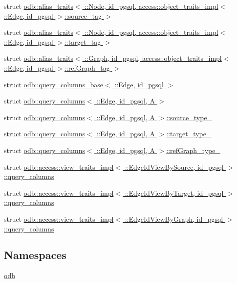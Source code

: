 \begin{DoxyCompactItemize}
\item 
struct \hyperlink{structodb_1_1alias__traits_3_01_1_1_node_00_01id__pgsql_00_01access_1_1object__traits__impl_3_01db58b174ecb0ad95fbb7b688e9500987}{odb\+::alias\+\_\+traits$<$ \+::\+Node, id\+\_\+pgsql, access\+::object\+\_\+traits\+\_\+impl$<$ \+::\+Edge, id\+\_\+pgsql $>$\+::source\+\_\+tag $>$}
\item 
struct \hyperlink{structodb_1_1alias__traits_3_01_1_1_node_00_01id__pgsql_00_01access_1_1object__traits__impl_3_01c77bcdc9abf6acd8227118fe90727154}{odb\+::alias\+\_\+traits$<$ \+::\+Node, id\+\_\+pgsql, access\+::object\+\_\+traits\+\_\+impl$<$ \+::\+Edge, id\+\_\+pgsql $>$\+::target\+\_\+tag $>$}
\item 
struct \hyperlink{structodb_1_1alias__traits_3_01_1_1_graph_00_01id__pgsql_00_01access_1_1object__traits__impl_3_0b3284584314bfa017251cf7444a96ae4}{odb\+::alias\+\_\+traits$<$ \+::\+Graph, id\+\_\+pgsql, access\+::object\+\_\+traits\+\_\+impl$<$ \+::\+Edge, id\+\_\+pgsql $>$\+::ref\+Graph\+\_\+tag $>$}
\item 
struct \hyperlink{structodb_1_1query__columns__base_3_01_1_1_edge_00_01id__pgsql_01_4}{odb\+::query\+\_\+columns\+\_\+base$<$ \+::\+Edge, id\+\_\+pgsql $>$}
\item 
struct \hyperlink{structodb_1_1query__columns_3_01_1_1_edge_00_01id__pgsql_00_01_a_01_4}{odb\+::query\+\_\+columns$<$ \+::\+Edge, id\+\_\+pgsql, A $>$}
\item 
struct \hyperlink{structodb_1_1query__columns_3_01_1_1_edge_00_01id__pgsql_00_01_a_01_4_1_1source__type__}{odb\+::query\+\_\+columns$<$ \+::\+Edge, id\+\_\+pgsql, A $>$\+::source\+\_\+type\+\_\+}
\item 
struct \hyperlink{structodb_1_1query__columns_3_01_1_1_edge_00_01id__pgsql_00_01_a_01_4_1_1target__type__}{odb\+::query\+\_\+columns$<$ \+::\+Edge, id\+\_\+pgsql, A $>$\+::target\+\_\+type\+\_\+}
\item 
struct \hyperlink{structodb_1_1query__columns_3_01_1_1_edge_00_01id__pgsql_00_01_a_01_4_1_1ref_graph__type__}{odb\+::query\+\_\+columns$<$ \+::\+Edge, id\+\_\+pgsql, A $>$\+::ref\+Graph\+\_\+type\+\_\+}
\item 
struct \hyperlink{structodb_1_1access_1_1view__traits__impl_3_01_1_1_edge_id_view_by_source_00_01id__pgsql_01_4_1_1query__columns}{odb\+::access\+::view\+\_\+traits\+\_\+impl$<$ \+::\+Edge\+Id\+View\+By\+Source, id\+\_\+pgsql $>$\+::query\+\_\+columns}
\item 
struct \hyperlink{structodb_1_1access_1_1view__traits__impl_3_01_1_1_edge_id_view_by_target_00_01id__pgsql_01_4_1_1query__columns}{odb\+::access\+::view\+\_\+traits\+\_\+impl$<$ \+::\+Edge\+Id\+View\+By\+Target, id\+\_\+pgsql $>$\+::query\+\_\+columns}
\item 
struct \hyperlink{structodb_1_1access_1_1view__traits__impl_3_01_1_1_edge_id_view_by_graph_00_01id__pgsql_01_4_1_1query__columns}{odb\+::access\+::view\+\_\+traits\+\_\+impl$<$ \+::\+Edge\+Id\+View\+By\+Graph, id\+\_\+pgsql $>$\+::query\+\_\+columns}
\end{DoxyCompactItemize}
\subsection*{Namespaces}
\begin{DoxyCompactItemize}
\item 
 \hyperlink{namespaceodb}{odb}
\end{DoxyCompactItemize}
